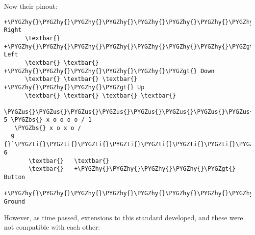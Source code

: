 \documentclass[a4paper,8pt,english]{sphinxmanual}
\def\PYGZbs{\char`\\}
\def\PYGZus{\char`\_}
\def\PYGZgt{\char`\>}
\def\PYGZhy{\char`\-}
\def\PYGZsq{\char`\'}
\def\PYGZti{\char`\~}
\renewcommand\PYGZsq{\textquotesingle}
\begin{document}
Now their pinout:

\begin{Verbatim}[commandchars=\\\{\}]
      +\PYGZhy{}\PYGZhy{}\PYGZhy{}\PYGZhy{}\PYGZhy{}\PYGZhy{}\PYGZhy{}\PYGZhy{}\PYGZhy{}\PYGZgt{} Right
      \textbar{} +\PYGZhy{}\PYGZhy{}\PYGZhy{}\PYGZhy{}\PYGZhy{}\PYGZhy{}\PYGZhy{}\PYGZgt{} Left
      \textbar{} \textbar{} +\PYGZhy{}\PYGZhy{}\PYGZhy{}\PYGZhy{}\PYGZhy{}\PYGZgt{} Down
      \textbar{} \textbar{} \textbar{} +\PYGZhy{}\PYGZhy{}\PYGZhy{}\PYGZgt{} Up
      \textbar{} \textbar{} \textbar{} \textbar{}
  \PYGZus{}\PYGZus{}\PYGZus{}\PYGZus{}\PYGZus{}\PYGZus{}\PYGZus{}\PYGZus{}\PYGZus{}\PYGZus{}\PYGZus{}\PYGZus{}\PYGZus{}
5 \PYGZbs{} x o o o o / 1
   \PYGZbs{} x o x o /
  9 {}`\PYGZti{}\PYGZti{}\PYGZti{}\PYGZti{}\PYGZti{}\PYGZti{}\PYGZti{}\PYGZsq{} 6
       \textbar{}   \textbar{}
       \textbar{}   +\PYGZhy{}\PYGZhy{}\PYGZhy{}\PYGZhy{}\PYGZgt{} Button
       +\PYGZhy{}\PYGZhy{}\PYGZhy{}\PYGZhy{}\PYGZhy{}\PYGZhy{}\PYGZhy{}\PYGZhy{}\PYGZgt{} Ground
\end{Verbatim}

However, as time passed, extensions to this standard developed, and these
were not compatible with each other:
\end{document}
